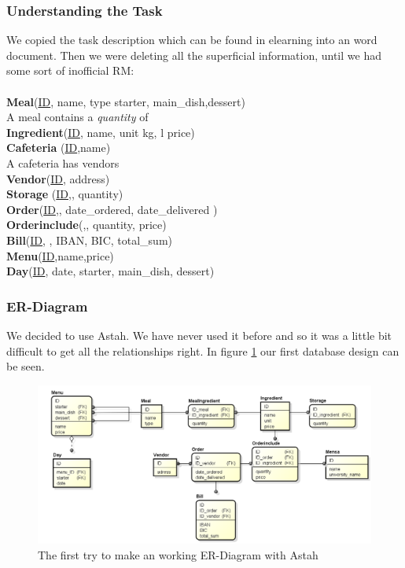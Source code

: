 \documentclass[12pt]{article}
\begin{document}
\subsubsection{Understanding the Task}
We copied the task description which can be found in elearning into an word document. 
Then we were deleting all the superficial information, until we had some sort of inofficial RM: \\
\\
\textbf{Meal}(\underline{ID}, name, type {starter, main\_dish,dessert}) \\
A meal contains a \textit{quantity} of \\
\textbf{Ingredient}(\underline{ID}, name, unit {kg, l} price) \\
\textbf{Cafeteria}  (\underline{ID},name) \\
A cafeteria has vendors  \\
\textbf{Vendor}(\underline{ID}, address) \\
\textbf{Storage} (\underline{ID},, quantity) \\
\textbf{Order}(\underline{ID},, date\_ordered, date\_delivered ) \\
\textbf{Orderinclude}(,, quantity, price) \\
\textbf{Bill}(\underline{ID}, , IBAN, BIC, total\_sum) \\
\textbf{Menu}(\underline{ID},name,price) \\
\textbf{Day}(\underline{ID}, date, starter, main\_dish, dessert) \\
\subsubsection{ER-Diagram}
We decided to use Astah. We have never used it before and so it was a little bit difficult to get all the relationships right.
In figure \ref{fig:try1} our first database design can be seen.
 \begin{figure}[here!]
	\centering
	\includegraphics[width=1.0\textwidth]{images/er_vorlaeufig.png}
	\caption{The first try to make an working ER-Diagram with Astah}
	\label{fig:try1}
	\end{figure}
	
\end{document}
